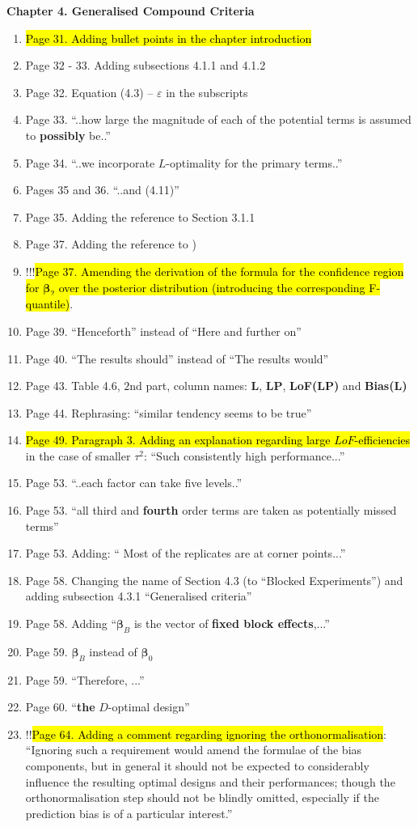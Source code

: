 \documentclass[11pt,a4paper,oneside]{article}
\begin{document}
\textbf{Chapter 4. Generalised Compound Criteria}
\begin{enumerate}
\item \hl{Page 31. Adding bullet points in the chapter introduction}
\item Page 32 - 33. Adding subsections 4.1.1 and 4.1.2
\item Page 32. Equation (4.3) -- $\varepsilon$ in the subscripts
\item Page 33. ``..how large the magnitude of each of the potential terms is assumed to \textbf{possibly} be..''
\item Page 34. ``..we incorporate $L$-optimality for the primary terms..''
\item Pages 35 and 36. ``..and (4.11)''
\item Page 35. Adding the reference to Section 3.1.1
\item Page 37. Adding the reference to \cite{DuMouchel1994})
\item !!!\hl{Page 37. Amending the derivation of the formula for the confidence region for $\bm{\beta}_2$ over the posterior distribution (introducing the corresponding F-quantile)}.
\item Page 39. ``Henceforth'' instead of ``Here and further on''
\item Page 40. ``The results should'' instead of ``The results would''
\item Page 43. Table 4.6, $2$nd part, column names: \textbf{L}, \textbf{LP}, \textbf{LoF(LP)} and \textbf{Bias(L)}
\item Page 44. Rephrasing: ``similar tendency seems to be true''
\item \hl{Page 49. Paragraph 3. Adding an explanation regarding large $LoF$-efficiencies} in the case of smaller $\tau^2$: ``Such consistently high performance...''
\item Page 53. ``..each factor can take five levels..''
\item Page 53. ``all third and \textbf{fourth} order terms are taken as potentially missed terms''
\item Page 53. Adding: `` Most of the replicates are at corner points...''
\item Page 58. Changing the name of Section 4.3 (to ``Blocked Experiments'') and adding  subsection 4.3.1 ``Generalised criteria''
\item Page 58. Adding ``$\bm{\beta}_{B}$ is the vector of \textbf{fixed block effects},...'' 
\item Page 59. $\bm{\beta}_{B}$ instead of $\bm{\beta}_{0}$
\item Page 59. ``Therefore, ...'' 
\item Page 60. ``\textbf{the} $D$-optimal design''
\item !!\hl{Page 64. Adding a comment regarding ignoring the orthonormalisation}: ``Ignoring such a requirement would amend the formulae of the bias components, but in general it should not be expected to considerably influence the resulting optimal designs and their performances; though the orthonormalisation step should not be blindly omitted, especially if the prediction bias is of a particular interest.''
\end{enumerate}
\end{document}
